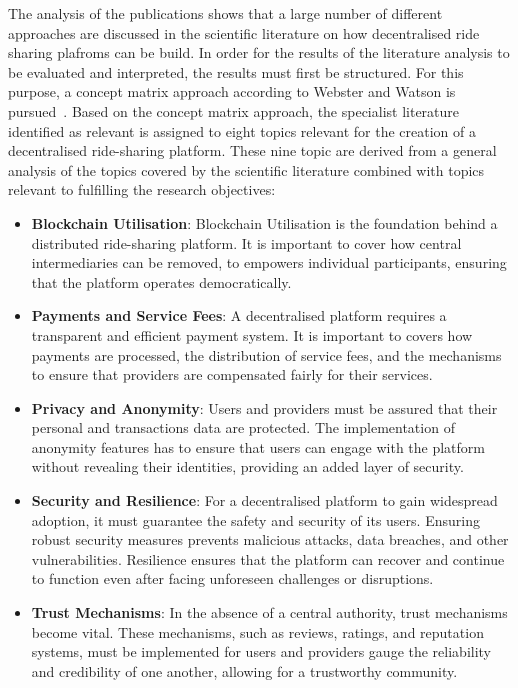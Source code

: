 The analysis of the publications shows that a large number of different approaches are discussed in the scientific literature on how decentralised ride sharing plafroms can be build. In order for the results of the literature analysis to be evaluated and interpreted, the results must first be structured. For this purpose, a concept matrix approach according to Webster and Watson is pursued~\cite{Webster.2002}. Based on the concept matrix approach, the specialist literature identified as relevant is assigned to eight topics relevant for the creation of a decentralised ride-sharing platform. These nine topic are derived from a general analysis of the topics covered by the scientific literature combined with topics relevant to fulfilling the research objectives:

\begin{itemize}
    \item \textbf{Blockchain Utilisation}: Blockchain Utilisation is the foundation behind a distributed ride-sharing platform. It is important to cover how central intermediaries can be removed, to empowers individual participants, ensuring that the platform operates democratically. 
    
    \item \textbf{Payments and Service Fees}: A decentralised platform requires a transparent and efficient payment system. It is important to covers how payments are processed, the distribution of service fees, and the mechanisms to ensure that providers are compensated fairly for their services.

    \item \textbf{Privacy and Anonymity}:  Users and providers must be assured that their personal and transactions data are protected. The implementation of anonymity features has to ensure that users can engage with the platform without revealing their identities, providing an added layer of security.
    
    \item \textbf{Security and Resilience}: For a decentralised platform to gain widespread adoption, it must guarantee the safety and security of its users. Ensuring robust security measures prevents malicious attacks, data breaches, and other vulnerabilities. Resilience ensures that the platform can recover and continue to function even after facing unforeseen challenges or disruptions.
    
    \item \textbf{Trust Mechanisms}: In the absence of a central authority, trust mechanisms become vital. These mechanisms, such as reviews, ratings, and reputation systems, must be implemented for users and providers gauge the reliability and credibility of one another, allowing for a trustworthy community.
    

\end{itemize}
